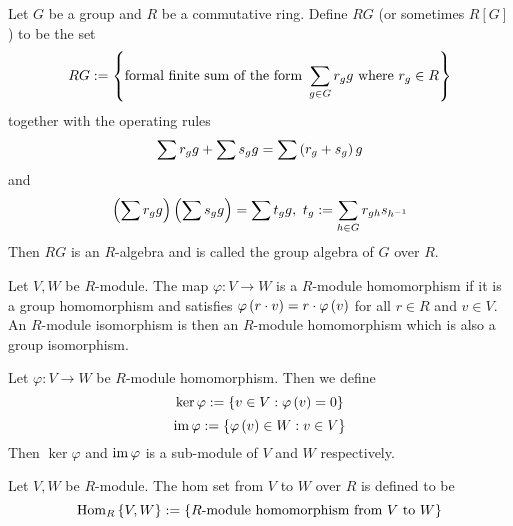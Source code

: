 \medskip

\begin{ex} 
    Let $G$ be a group and $R$ be a commutative ring. Define $RG$ (or sometimes $R[G]$) to be the set
    \[RG:= \left\{\text{formal finite sum of the form }\sum_{g\in G}r_g g \text{ where }r_g\in R\right\}\]
    together with the operating rules
    \[\sum r_g g + \sum s_g g = \sum\left(r_g+s_g\right)g\]
    and 
    \[\left(\sum r_g g\right)\left(\sum s_g g\right) = \sum t_g g,\ t_g := \sum_{h\in G}r_{gh}s_{h^{-1}}\]
    Then $RG$ is an $R$-algebra and is called the group algebra of $G$ over $R$.
\end{ex}

\medskip

\begin{defn} 
    Let $V,W$ be $R$-module. The map $\varphi:V\to W$ is a $R$-module homomorphism if it is a group homomorphism and satisfies $\varphi\left(r\cdot v\right) = r\cdot \varphi\left(v\right)$ for all $r\in R$ and $v\in V$. An $R$-module isomorphism is then an $R$-module homomorphism which is also a group isomorphism.
\end{defn}

\medskip

\begin{ex} 
    Let $\varphi:V\to W$ be $R$-module homomorphism. Then we define
    \[\ker\varphi := \left\{v\in V:\varphi\left(v\right)=0\right\}\]
    \[\operatorname{im} \varphi := \left\{\varphi\left(v\right)\in W:v\in V\right\}\]
    Then $\ker \varphi$ and $\operatorname{im}\varphi$ is a sub-module of $V$ and $W$ respectively.
\end{ex}

\medskip


\begin{ex}
    Let $V,W$ be $R$-module. The hom set from $V$ to $W$ over $R$ is defined to be
    \[\operatorname{Hom}_R\left\{V,W\right\}:=\left\{\text{$R$-module homomorphism from $V$ to $W$}\right\}\]
\end{ex}

\medskip


